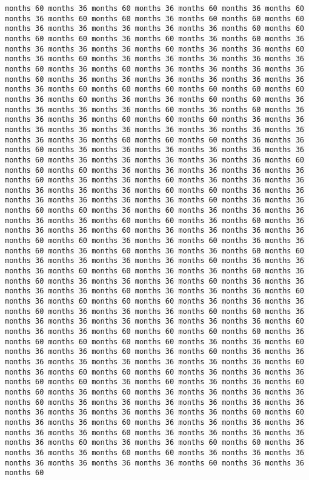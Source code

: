 \documentclass[11pt]{article}
\begin{document}
\begin{Verbatim}[commandchars=\\\{\}, frame=single, framerule=2mm, rulecolor=\color{outerrorbackground}]
months 60 months 36 months 60 months 36 months 60 months 36 months 60 months 36 months 60 months 60 months 36 months 60 months 60 months 60 months 36 months 36 months 36 months 36 months 36 months 60 months 60 months 60 months 60 months 36 months 60 months 36 months 60 months 36 months 36 months 36 months 36 months 60 months 36 months 36 months 60 months 36 months 60 months 36 months 36 months 36 months 36 months 36 months 60 months 36 months 60 months 36 months 36 months 36 months 36 months 60 months 36 months 36 months 36 months 36 months 36 months 36 months 36 months 60 months 60 months 60 months 60 months 60 months 60 months 36 months 60 months 36 months 36 months 60 months 60 months 36 months 36 months 36 months 36 months 60 months 36 months 60 months 36 months 36 months 36 months 60 months 60 months 60 months 36 months 36 months 36 months 36 months 36 months 36 months 36 months 36 months 36 months 36 months 36 months 60 months 60 months 60 months 36 months 36 months 60 months 36 months 36 months 36 months 36 months 36 months 36 months 60 months 36 months 36 months 36 months 36 months 36 months 60 months 60 months 60 months 36 months 36 months 36 months 36 months 36 months 60 months 36 months 36 months 60 months 36 months 36 months 36 months 36 months 36 months 36 months 60 months 60 months 36 months 36 months 36 months 36 months 36 months 36 months 60 months 36 months 36 months 60 months 60 months 36 months 60 months 36 months 36 months 36 months 36 months 36 months 60 months 60 months 36 months 60 months 36 months 36 months 36 months 60 months 36 months 36 months 36 months 36 months 60 months 60 months 36 months 36 months 60 months 36 months 36 months 60 months 36 months 60 months 36 months 36 months 60 months 60 months 36 months 36 months 36 months 36 months 60 months 36 months 36 months 36 months 60 months 60 months 36 months 36 months 60 months 36 months 60 months 36 months 36 months 36 months 60 months 36 months 36 months 36 months 36 months 60 months 36 months 36 months 36 months 60 months 36 months 60 months 60 months 60 months 36 months 36 months 36 months 60 months 36 months 36 months 36 months 60 months 60 months 36 months 36 months 36 months 36 months 36 months 36 months 36 months 60 months 36 months 36 months 60 months 60 months 60 months 60 months 36 months 60 months 60 months 60 months 60 months 36 months 36 months 60 months 36 months 36 months 60 months 36 months 60 months 36 months 36 months 36 months 36 months 36 months 36 months 36 months 36 months 60 months 36 months 60 months 60 months 60 months 36 months 36 months 36 months 60 months 60 months 36 months 60 months 36 months 36 months 60 months 60 months 36 months 60 months 36 months 36 months 36 months 36 months 60 months 36 months 36 months 36 months 36 months 36 months 36 months 36 months 36 months 36 months 36 months 36 months 60 months 60 months 36 months 36 months 60 months 36 months 36 months 36 months 36 months 36 months 36 months 60 months 36 months 36 months 36 months 36 months 36 months 60 months 36 months 36 months 60 months 60 months 36 months 36 months 36 months 60 months 60 months 36 months 36 months 36 months 36 months 36 months 36 months 36 months 60 months 36 months 36 months 60 
\end{Verbatim}
\end{document}
